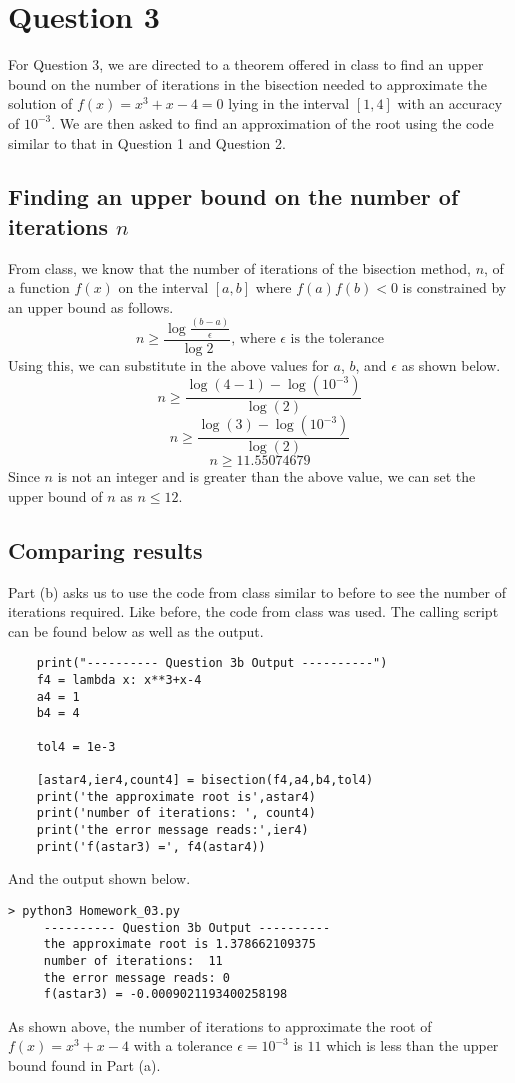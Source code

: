 \documentclass{article}
\theoremstyle{theorem}
\begin{document}
\section{Question 3}
For Question 3, we are directed to a theorem offered in class to find an upper bound on the number of iterations in the bisection needed to approximate the solution of \(f(x)=x^3+x-4=0\) lying in the interval \([1,4]\) with an accuracy of \(10^{-3}\). We are then asked to find an approximation of the root using the code similar to that in Question 1 and Question 2.

\subsection{Finding an upper bound on the number of iterations \(n\)}
From class, we know that the number of iterations of the bisection method, \(n\), of a function \(f(x)\) on the interval \([a,b]\) where \(f(a)f(b) < 0\) is constrained by an upper bound as follows.
\[
n \geq \frac{\log{\frac{(b-a)}{\epsilon}}}{\log{2}} \mbox{, where } \epsilon \mbox{ is the tolerance}
\]
Using this, we can substitute in the above values for \(a\), \(b\), and \(\epsilon\) as shown below.
\[
n \geq \frac{\log{(4-1)}-\log{(10^{-3})}}{\log{(2)}}
\]
\[
n \geq \frac{\log{(3)}-\log{(10^{-3})}}{\log{(2)}}
\]
\[
n \geq 11.55074679
\]
Since \(n\) is not an integer and is greater than the above value, we can set the upper bound of \(n\) as \(n \leq 12\).

\subsection{Comparing results}
Part (b) asks us to use the code from class similar to before to see the number of iterations required. Like before, the code from class was used. The calling script can be found below as well as the output.
\begin{lstlisting}
    print("---------- Question 3b Output ----------")
    f4 = lambda x: x**3+x-4
    a4 = 1
    b4 = 4

    tol4 = 1e-3

    [astar4,ier4,count4] = bisection(f4,a4,b4,tol4)
    print('the approximate root is',astar4)
    print('number of iterations: ', count4)
    print('the error message reads:',ier4)
    print('f(astar3) =', f4(astar4))
\end{lstlisting}
And the output shown below.
\begin{lstlisting}
> python3 Homework_03.py
     ---------- Question 3b Output ----------
     the approximate root is 1.378662109375
     number of iterations:  11
     the error message reads: 0
     f(astar3) = -0.0009021193400258198
\end{lstlisting}
As shown above, the number of iterations to approximate the root of \(f(x) = x^3+x-4\) with a tolerance \(\epsilon = 10^{-3}\) is \(11\) which is less than the upper bound found in Part (a).
\end{document}

